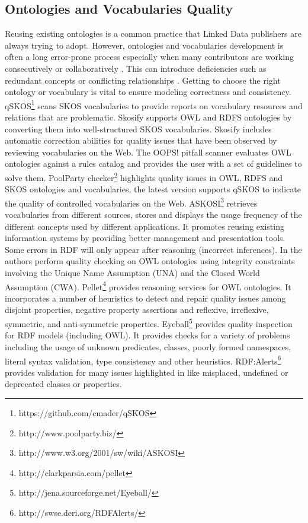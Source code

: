\documentclass[onecolumn, crcready]{iosart2c}
\begin{document}
\subsection {Ontologies and Vocabularies Quality}
Reusing existing ontologies is a common practice that Linked Data publishers are always trying to adopt. However, ontologies and vocabularies development is often a long error-prone process especially when many contributors are working consecutively or collaboratively \cite{Suominen2013}. This can introduce deficiencies such as redundant concepts or conflicting relationships \cite{harpring_introduction_2010}. Getting to choose the right ontology or vocabulary is vital to ensure modeling correctness and consistency.\\ qSKOS\footnote{https://github.com/cmader/qSKOS} \cite{Mader2012} scans SKOS vocabularies to provide reports on vocabulary resources and relations that are problematic. Skosify \cite{Suominen:2012:IQS:2413941.2413985} supports OWL and RDFS ontologies by converting them into well-structured SKOS vocabularies. Skosify includes automatic correction abilities for quality issues that have been observed by reviewing vocabularies on the Web. The OOPS! pitfall scanner \cite{oops} evaluates OWL ontologies against a rules catalog and provides the user with a set of guidelines to solve them. PoolParty checker\footnote{http://www.poolparty.biz/} highlights quality issues in OWL, RDFS and SKOS ontologies and vocabularies, the latest version supports qSKOS to indicate the quality of controlled vocabularies on the Web. ASKOSI\footnote{http://www.w3.org/2001/sw/wiki/ASKOSI} retrieves vocabularies from different sources, stores and displays the usage frequency of the different concepts used by different applications. It promotes reusing existing information systems by providing better management and presentation tools.\\ Some errors in RDF will only appear after reasoning (incorrect inferences). In \cite{conf/owled/SirinSW08}\cite{conf/hicss/TaoDM09} the authors perform quality checking on OWL ontologies using integrity constraints involving the Unique Name Assumption (UNA) and the Closed World Assumption (CWA). Pellet\footnote{http://clarkparsia.com/pellet} provides reasoning services for OWL ontologies. It incorporates a number of heuristics to detect and repair quality issues among disjoint properties, negative property assertions and reflexive, irreflexive, symmetric, and anti-symmetric properties. Eyeball\footnote{http://jena.sourceforge.net/Eyeball/} provides quality inspection for RDF models (including OWL). It provides checks for a variety of problems including the usage of unknown predicates, classes, poorly formed namespaces, literal syntax validation, type consistency and other heuristics. RDF:Alerts\footnote{http://swse.deri.org/RDFAlerts/} provides validation for many issues highlighted in \cite{Hogan2010} like misplaced, undefined or deprecated classes or properties.
\end{document}
